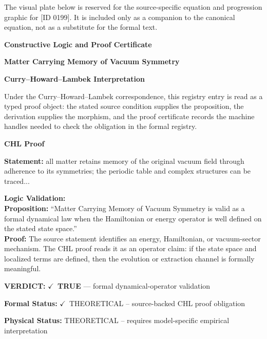 \begingroup\footnotesize\sloppy
The visual plate below is reserved for the source-specific equation and progression graphic for [ID 0199]. It is included only as a companion to the canonical equation, not as a substitute for the formal text.
\par\endgroup
\ifTZPDarkEdition
{}
\fi

\clearpage
\begingroup\tzpsupportsetup
\noindent\textbf{\fontsize{10.8pt}{12.8pt}\selectfont [ID 0199] Constructive Logic and Proof Certificate}\par
\noindent\textbf{\fontsize{10pt}{12pt}\selectfont Matter Carrying Memory of Vacuum Symmetry}\par
\vspace{0.45em}
\begingroup
\footnotesize
\setlength{\parskip}{0.22em}
\setlength{\parindent}{0pt}
\noindent\textbf{Curry--Howard--Lambek Interpretation}\par
Under the Curry--Howard--Lambek correspondence, this registry entry is read as a typed proof
object: the stated source condition supplies the proposition, the derivation supplies the
morphism, and the proof certificate records the machine handles needed to check the obligation
in the formal registry.

\vspace{0.45em}
\noindent\textbf{CHL Proof}\par
\textbf{Statement:} all matter retains memory of the original vacuum field through adherence to its
symmetries; the periodic table and complex structures can be traced...

\textbf{Logic Validation:}\\
\textbf{Proposition:} ``Matter Carrying Memory of Vacuum Symmetry is valid as a formal dynamical law when the
Hamiltonian or energy operator is well defined on the stated state space.''\\
\textbf{Proof:} The source statement identifies an energy, Hamiltonian, or vacuum-sector mechanism. The
CHL proof reads it as an operator claim: if the state space and localized terms are
defined, then the evolution or extraction channel is formally meaningful.

\textbf{VERDICT:} \ensuremath{\checkmark}\ \textbf{TRUE} --- formal dynamical-operator validation

\textbf{Formal Status:} \ensuremath{\checkmark}\ THEORETICAL -- source-backed CHL proof obligation

\textbf{Physical Status:} THEORETICAL -- requires model-specific empirical interpretation
\par\vspace{0.45em}
\par
\ifTZPDarkEdition
{}
\fi
\endgroup
\endgroup
